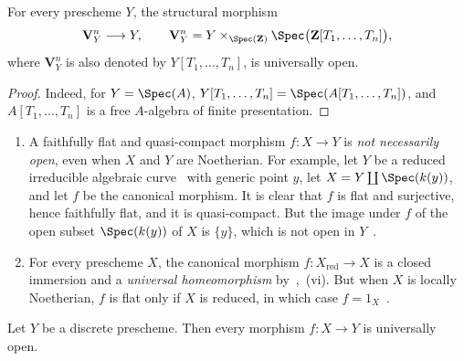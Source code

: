 \begin{corollary}[2.4.7]
\label{IV.2.4.7}
For every prescheme $Y$, the structural morphism
\[
  \mathbf{V}_Y^n\longrightarrow Y,
  \qquad
  \mathbf{V}_Y^n
  =Y\times_{\Spec(\mathbf{Z})}\Spec\bigl(\mathbf{Z}[T_1,\ldots,T_n]\bigr),
\]
where $\mathbf{V}_Y^n$ is also denoted by $Y[T_1,\ldots,T_n]$, is universally open.
\end{corollary}

\begin{proof}
Indeed, for $Y=\Spec(A)$, $Y[T_1,\ldots,T_n]=\Spec(A[T_1,\ldots,T_n])$, and $A[T_1,\ldots,T_n]$ is a free $A$-algebra of finite presentation.
\end{proof}

\begin{remark}[2.4.8]
\label{IV.2.4.8}
\medskip\noindent
\begin{enumerate}
  \item[(i)] A faithfully flat and quasi-compact morphism $f:X\to Y$ is \emph{not necessarily open}, even when $X$ and $Y$ are Noetherian.
    For example, let $Y$ be a reduced irreducible algebraic curve~ with generic point $y$, let $X=Y\coprod\Spec(k(y))$, and let $f$ be the canonical morphism. It is clear that $f$ is flat and surjective, hence faithfully flat, and it is quasi-compact. But the image under $f$ of the open subset $\Spec(k(y))$ of $X$ is $\{y\}$, which is not open in $Y$~.
  \item[(ii)] For every prescheme $X$, the canonical morphism $f:X_{\mathrm{red}}\to X$ is a closed immersion and a \emph{universal homeomorphism} by~,~(vi). But when $X$ is locally Noetherian, $f$ is flat only if $X$ is reduced, in which case $f=1_X$~.
\end{enumerate}
\end{remark}

\begin{proposition}[2.4.9]
\label{IV.2.4.9}
Let $Y$ be a discrete prescheme. Then every morphism $f:X\to Y$ is universally open.
\end{proposition}

